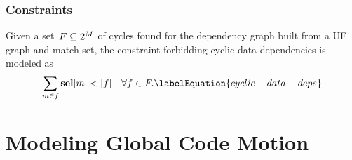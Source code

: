 \subsubsection{Constraints}

Given a set~\mbox{$\mForbiddenCombSet \subseteq \mPowerset{\mMatchSet}$} of
\glspl{cycle} found for the \gls{dependency graph} built from a \gls{UF graph}
and \gls{match set}, the \gls{constraint} forbidding cyclic data dependencies is
modeled as
%
\begin{equation}
  \sum_{m \in f} \mVar{sel}[m] < \mCard{f}
  \mQuantSep
  \forall f \in \mForbiddenCombSet.
  \labelEquation{cyclic-data-deps}
\end{equation}


\section{Modeling Global Code Motion}

